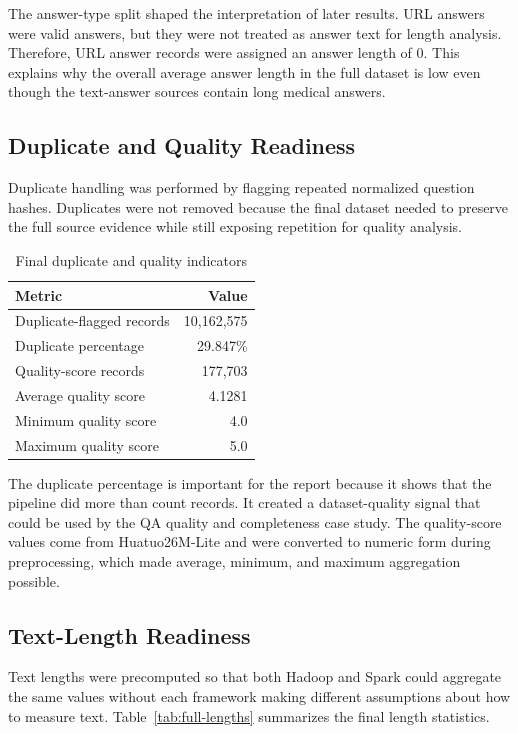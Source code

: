 \documentclass[12pt,a4paper]{article}
\begin{document}
The answer-type split shaped the interpretation of later results. URL answers were valid answers, but they were not treated as answer text for length analysis. Therefore, URL answer records were assigned an answer length of 0. This explains why the overall average answer length in the full dataset is low even though the text-answer sources contain long medical answers.

\subsection{Duplicate and Quality Readiness}

Duplicate handling was performed by flagging repeated normalized question hashes. Duplicates were not removed because the final dataset needed to preserve the full source evidence while still exposing repetition for quality analysis.

\begin{table}[H]
\centering
\caption{Final duplicate and quality indicators}
\label{tab:full-quality}
\begin{tabular}{lr}
\toprule
Metric & Value \\
\midrule
Duplicate-flagged records & 10,162,575 \\
Duplicate percentage & 29.847\% \\
Quality-score records & 177,703 \\
Average quality score & 4.1281 \\
Minimum quality score & 4.0 \\
Maximum quality score & 5.0 \\
\bottomrule
\end{tabular}
\end{table}

The duplicate percentage is important for the report because it shows that the pipeline did more than count records. It created a dataset-quality signal that could be used by the QA quality and completeness case study. The quality-score values come from Huatuo26M-Lite and were converted to numeric form during preprocessing, which made average, minimum, and maximum aggregation possible.

\subsection{Text-Length Readiness}

Text lengths were precomputed so that both Hadoop and Spark could aggregate the same values without each framework making different assumptions about how to measure text. Table~\ref{tab:full-lengths} summarizes the final length statistics.
\end{document}
